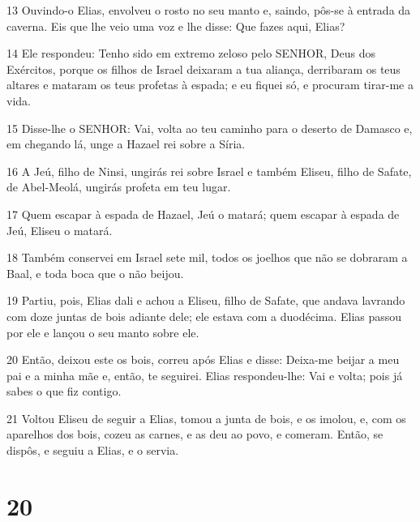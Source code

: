 \par 13 Ouvindo-o Elias, envolveu o rosto no seu manto e, saindo, pôs-se à entrada da caverna. Eis que lhe veio uma voz e lhe disse: Que fazes aqui, Elias?
\par 14 Ele respondeu: Tenho sido em extremo zeloso pelo SENHOR, Deus dos Exércitos, porque os filhos de Israel deixaram a tua aliança, derribaram os teus altares e mataram os teus profetas à espada; e eu fiquei só, e procuram tirar-me a vida.
\par 15 Disse-lhe o SENHOR: Vai, volta ao teu caminho para o deserto de Damasco e, em chegando lá, unge a Hazael rei sobre a Síria.
\par 16 A Jeú, filho de Ninsi, ungirás rei sobre Israel e também Eliseu, filho de Safate, de Abel-Meolá, ungirás profeta em teu lugar.
\par 17 Quem escapar à espada de Hazael, Jeú o matará; quem escapar à espada de Jeú, Eliseu o matará.
\par 18 Também conservei em Israel sete mil, todos os joelhos que não se dobraram a Baal, e toda boca que o não beijou.
\par 19 Partiu, pois, Elias dali e achou a Eliseu, filho de Safate, que andava lavrando com doze juntas de bois adiante dele; ele estava com a duodécima. Elias passou por ele e lançou o seu manto sobre ele.
\par 20 Então, deixou este os bois, correu após Elias e disse: Deixa-me beijar a meu pai e a minha mãe e, então, te seguirei. Elias respondeu-lhe: Vai e volta; pois já sabes o que fiz contigo.
\par 21 Voltou Eliseu de seguir a Elias, tomou a junta de bois, e os imolou, e, com os aparelhos dos bois, cozeu as carnes, e as deu ao povo, e comeram. Então, se dispôs, e seguiu a Elias, e o servia.

\chapter{20}

